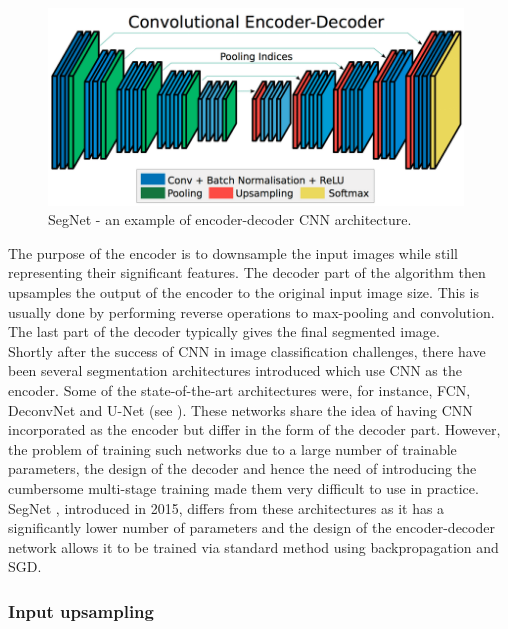 \vspace{4mm}
\begin{figure}[h]
	\begin{center}
		\includegraphics*[width=11cm, keepaspectratio]{obr/segnet.png}
	\end{center}
	\vspace{4mm}
	\caption{SegNet - an example of encoder-decoder CNN architecture. \cite{segnet}} 
	\label{encoder}
\end{figure}

The purpose of the encoder is to downsample the input images while still representing their significant features. The decoder part of the algorithm then upsamples the output of the encoder to the original input image size. This is usually done by performing reverse operations to max-pooling and convolution. The last part of the decoder typically gives the final segmented image. \\

Shortly after the success of CNN in image classification challenges, there have been several segmentation architectures introduced which use CNN as the encoder. Some of the state-of-the-art architectures were, for instance, FCN, DeconvNet and U-Net (see \cite{segnet}). These networks share the idea of having CNN incorporated as the encoder but differ in the form of the decoder part. However, the problem of training such networks due to a large number of trainable parameters, the design of the decoder and hence the need of introducing the cumbersome multi-stage training made them very difficult to use in practice. SegNet \cite{segnet}, introduced in 2015, differs from these architectures as it has a significantly lower number of parameters and the design of the encoder-decoder network allows it to be trained via standard method using backpropagation and SGD.  \cite{segnet}

\subsubsection{Input upsampling}

